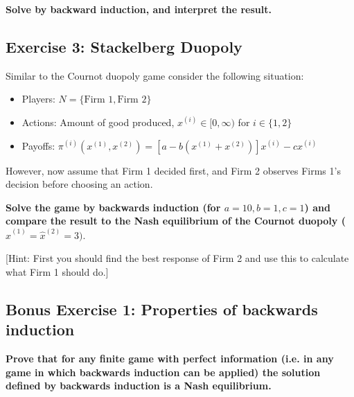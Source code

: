 \documentclass[10pt]{article}
\begin{document}
\textbf{Solve by backward induction, and interpret the result.}

\subsection*{Exercise 3: Stackelberg Duopoly}

Similar to the Cournot duopoly game consider the following situation:

\begin{itemize}
    \item Players: \(N = \{\text{Firm } 1, \text{Firm } 2\}\)
    \item Actions: Amount of good produced, \(x^{(i)} \in [0, \infty)\) for \(i \in \{1, 2\}\)
    \item Payoffs: \(\pi^{(i)}(x^{(1)}, x^{(2)}) = [a - b (x^{(1)} + x^{(2)})] x^{(i)} - c x^{(i)}\)
\end{itemize}

However, now assume that Firm 1 decided first, and Firm 2 observes Firms 1's
decision before choosing an action. 

\textbf{Solve the game by backwards induction (for \(a=10, b=1, c=1\)) and
compare the result to the Nash equilibrium of the Cournot duopoly
(\(\hat x^{(1)} = \hat x ^{(2)}  = 3)\)}.

[Hint: First you should find the best response of Firm 2 and use this to calculate
what Firm 1 should do.]

\subsection*{Bonus Exercise 1: Properties of backwards induction}

\textbf{
Prove that for any finite game with perfect information (i.e. in any game in which
backwards induction can be applied) the solution defined by backwards induction
is a Nash equilibrium.}
\end{document}
